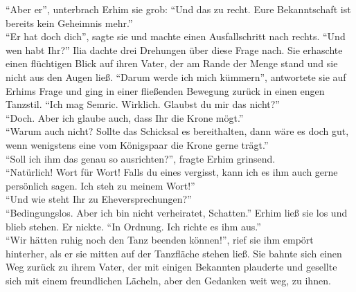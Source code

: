 ``Aber er'', unterbrach Erhim sie grob: ``Und das zu recht. Eure Bekanntschaft ist bereits kein 
Geheimnis mehr.''\\
``Er hat doch dich'', sagte sie und machte einen Ausfallschritt nach rechts.
``Und wen habt Ihr?''
Ilia dachte drei Drehungen über diese Frage nach. Sie erhaschte einen flüchtigen Blick auf ihren 
Vater, der am Rande der Menge stand und sie nicht aus den Augen ließ. ``Darum werde ich mich 
kümmern'', antwortete sie auf Erhims Frage und ging in einer fließenden Bewegung zurück in einen 
engen Tanzstil. ``Ich mag Semric. Wirklich. Glaubst du mir das nicht?''\\
``Doch. Aber ich glaube auch, dass Ihr die Krone mögt.''\\
``Warum auch nicht? Sollte das Schicksal es bereithalten, dann wäre es doch gut, wenn wenigstens 
eine vom Königspaar die Krone gerne trägt.''\\
``Soll ich ihm das genau so ausrichten?'', fragte Erhim grinsend.\\
``Natürlich! Wort für Wort! Falls du eines vergisst, kann ich es ihm auch gerne persönlich 
sagen. Ich steh zu meinem Wort!''\\
``Und wie steht Ihr zu Eheversprechungen?''\\
``Bedingungslos. Aber ich bin nicht verheiratet, Schatten.''
Erhim ließ sie los und blieb stehen. Er nickte. ``In Ordnung. Ich richte es ihm aus.''\\
``Wir hätten ruhig noch den Tanz beenden können!'', rief sie ihm empört hinterher, als er sie 
mitten auf der Tanzfläche stehen ließ. Sie bahnte sich einen Weg zurück zu ihrem Vater, der mit 
einigen Bekannten plauderte und gesellte sich mit einem freundlichen Lächeln, aber den Gedanken weit 
weg, zu ihnen.\\

